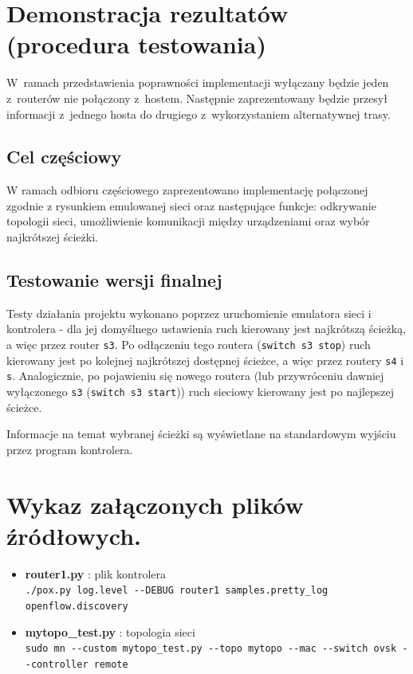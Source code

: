 \documentclass{article}
\begin{document}
	\section{Demonstracja rezultatów (procedura testowania)}
	W~ramach przedstawienia poprawności implementacji wyłączany będzie jeden z~routerów nie połączony z~hostem. Następnie zaprezentowany będzie przesył informacji z~jednego hosta do drugiego z~wykorzystaniem alternatywnej trasy. 
	\subsection{Cel częściowy}
	W ramach odbioru częściowego zaprezentowano implementację połączonej zgodnie z rysunkiem emulowanej sieci oraz następujące funkcje: odkrywanie topologii sieci, umożliwienie komunikacji między urządzeniami oraz wybór najkrótszej ścieżki.
	\subsection{Testowanie wersji finalnej}
	Testy działania projektu wykonano poprzez uruchomienie emulatora sieci i kontrolera - dla jej domyślnego ustawienia ruch kierowany jest najkrótszą ścieżką, a więc przez router \texttt{s3}. Po odłączeniu tego routera (\verb|switch s3 stop|) ruch kierowany jest po kolejnej najkrótszej dostępnej ścieżce, a więc przez routery \texttt{s4} i \texttt{s}. Analogicznie, po pojawieniu się nowego routera (lub przywróceniu dawniej wyłączonego \texttt{s3} (\verb|switch s3 start|)) ruch sieciowy kierowany jest po najlepszej ścieżce.
	
	Informacje na temat wybranej ścieżki są wyświetlane na standardowym wyjściu przez program kontrolera.
	

	\section{Wykaz załączonych plików źródłowych.}
	\begin{itemize}
		\item \textbf{router1.py} : plik kontrolera \\ 
		\verb|./pox.py log.level --DEBUG router1 samples.pretty_log openflow.discovery|
		\item \textbf{mytopo\_test.py} : topologia sieci \\
		\verb|sudo mn --custom mytopo_test.py --topo mytopo --mac --switch ovsk --controller remote|%
	\end{itemize}
	
\end{document}
